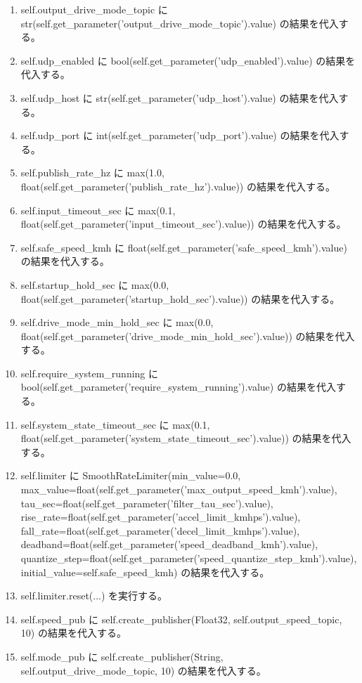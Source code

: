 \documentclass[a4paper,11pt]{article}
\begin{document}
\begin{enumerate}[leftmargin=1.8em]
\item self.output\_drive\_mode\_topic に str(self.get\_parameter('output\_drive\_mode\_topic').value) の結果を代入する。
\item self.udp\_enabled に bool(self.get\_parameter('udp\_enabled').value) の結果を代入する。
\item self.udp\_host に str(self.get\_parameter('udp\_host').value) の結果を代入する。
\item self.udp\_port に int(self.get\_parameter('udp\_port').value) の結果を代入する。
\item self.publish\_rate\_hz に max(1.0, float(self.get\_parameter('publish\_rate\_hz').value)) の結果を代入する。
\item self.input\_timeout\_sec に max(0.1, float(self.get\_parameter('input\_timeout\_sec').value)) の結果を代入する。
\item self.safe\_speed\_kmh に float(self.get\_parameter('safe\_speed\_kmh').value) の結果を代入する。
\item self.startup\_hold\_sec に max(0.0, float(self.get\_parameter('startup\_hold\_sec').value)) の結果を代入する。
\item self.drive\_mode\_min\_hold\_sec に max(0.0, float(self.get\_parameter('drive\_mode\_min\_hold\_sec').value)) の結果を代入する。
\item self.require\_system\_running に bool(self.get\_parameter('require\_system\_running').value) の結果を代入する。
\item self.system\_state\_timeout\_sec に max(0.1, float(self.get\_parameter('system\_state\_timeout\_sec').value)) の結果を代入する。
\item self.limiter に SmoothRateLimiter(min\_value=0.0, max\_value=float(self.get\_parameter('max\_output\_speed\_kmh').value), tau\_sec=float(self.get\_parameter('filter\_tau\_sec').value), rise\_rate=float(self.get\_parameter('accel\_limit\_kmhps').value), fall\_rate=float(self.get\_parameter('decel\_limit\_kmhps').value), deadband=float(self.get\_parameter('speed\_deadband\_kmh').value), quantize\_step=float(self.get\_parameter('speed\_quantize\_step\_kmh').value), initial\_value=self.safe\_speed\_kmh) の結果を代入する。
\item self.limiter.reset(...) を実行する。
\item self.speed\_pub に self.create\_publisher(Float32, self.output\_speed\_topic, 10) の結果を代入する。
\item self.mode\_pub に self.create\_publisher(String, self.output\_drive\_mode\_topic, 10) の結果を代入する。

\end{enumerate}
\end{document}
